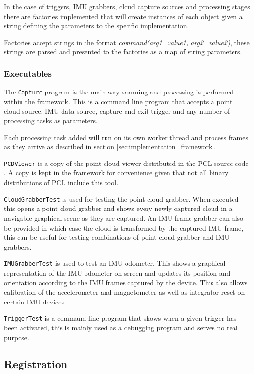 \documentclass{entcs}
\begin{document}
In the case of triggers, IMU grabbers, cloud capture sources and processing
stages there are factories implemented that will create instances of each object
given a string defining the parameters to the specific implementation.

Factories accept strings in the format \textit{command(arg1=value1,
arg2=value2)}, these strings are parsed and presented to the factories as a map
of string parameters.

\subsubsection{Executables}

The \texttt{Capture} program is the main way scanning and processing is
performed within the framework. This is a command line program that accepts a
point cloud source, IMU data source, capture and exit trigger and any number of
processing tasks as parameters.

Each processing task added will run on its own worker thread and process frames
as they arrive as described in section \ref{sec:implementation_framework}.

\texttt{PCDViewer} is a copy of the point cloud viewer distributed in the PCL
source code \cite{PCLPCDViewer}. A copy is kept in the framework for
convenience given that not all binary distributions of PCL include this tool.

\texttt{CloudGrabberTest} is used for testing the point cloud grabber. When
executed this opens a point cloud grabber and shows every newly captured cloud
in a navigable graphical scene as they are captured. An IMU frame grabber can
also be provided in which case the cloud is transformed by the captured IMU
frame, this can be useful for testing combinations of point cloud grabber and
IMU grabbers.

\texttt{IMUGrabberTest} is used to test an IMU odometer. This shows a graphical
representation of the IMU odometer on screen and updates its position and
orientation according to the IMU frames captured by the device. This also allows
calibration of the accelerometer and magnetometer as well as integrator reset on
certain IMU devices.

\texttt{TriggerTest} is a command line program that shows when a given trigger
has been activated, this is mainly used as a debugging program and serves no
real purpose.

\subsection{Registration}
\label{sec:implementation_registration}
\end{document}
